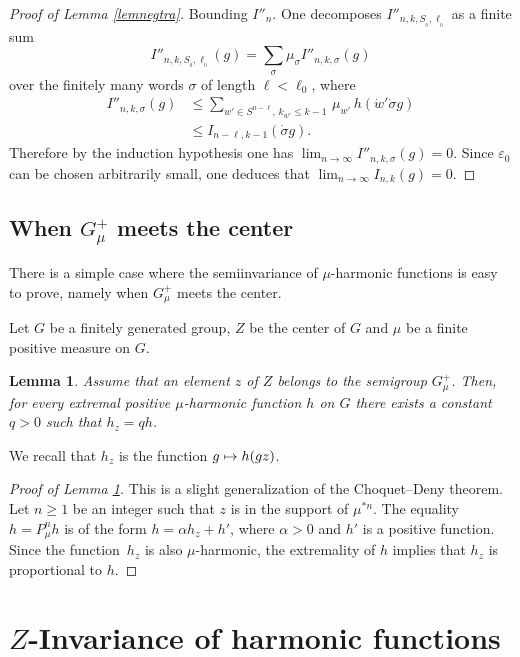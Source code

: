 \documentclass[11pt]{article}
\numberwithin{equation}{section}
\def\mto{\mathchoice{\longmapsto}{\mapsto}{\mapsto}{\mapsto}}
\newtheorem{Lem}[Thm]{Lemma}
\theoremstyle{definition}
\let\al\alpha
\let\eps\varepsilon
\let\si\sigma
\let\bq\relax
\let\eq\relax
\let\ra\to
\begin{document}
\begin{proof}[Proof of Lemma \ref{lemnegtra}]
Bounding $I''_n$. One decomposes $I''_{n,k,S_{_0},\ell_{_0}}$
as a finite sum
\[
I''_{n,k,S_{_0},\ell_{_0}}(g)=\sum_{\si} \mu_{\si}I''_{n,k,\si}(g)
\]
over the finitely many words $\si$ of length $\ell<\ell_0$,
where
\begin{align*}
I''_{n,k,\si}(g)& \leq
\sum_{w'\in S^{n-\ell},\, k_{w'}\leq k-1}\, \mu_{w'}\, h({\dot{w}}'\dot{\si}g)\\
&\leq I_{n-\ell,k-1}(\dot{\si}g).
\end{align*}
Therefore by the induction hypothesis one has $\lim_{n\ra\infty}I''_{n,k,\si}(g)=0$.
Since $\eps_0$ can be chosen arbitrarily small, one deduces that
$\lim_{n\ra\infty}I_{n,k}(g)=0$.
\end{proof}

\subsection{When $G_\mu^+$ meets the center}
\label{secgmucen}

\bq
There is a simple case where the semiinvariance of $\mu$-harmonic
functions is easy to prove, namely when $G_\mu^+$ meets the center.
\eq

Let $G$ be a finitely generated group, $Z$ be the center of $G$ and
$\mu$ be a finite positive measure on $G$.

\begin{Lem}
\label{lemgmucen}
Assume that an element $z$ of $Z$
belongs to the semigroup $G_\mu^+$.
Then, for every extremal positive
$\mu$-harmonic function $h$ on $G$
there exists a constant $q>0$ such that $h_z=qh$.
\end{Lem}

We recall that $h_z$ is the function $g\mto h(gz)$.

\begin{proof}[Proof of Lemma \ref{lemgmucen}]
This is a slight generalization of the Choquet--Deny
theorem. Let $n\geq 1$ be an integer such that $z$ is in the support
of $\mu^{*n}$. The equality $h=P^n_\mu h$ is of the form
$h= \al h_z +h'$, where $\al>0$ and $h'$ is a positive function.
Since the function~$h_z$ is also $\mu$-harmonic, the extremality of $h$
implies that $h_z$ is proportional to $h$.
\end{proof}

\section{\texorpdfstring{$Z$}{Z}-Invariance of harmonic functions}
\label{secinvhar}
\end{document}
